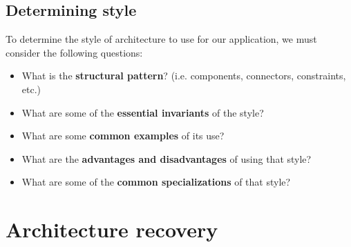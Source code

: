 \documentclass[12pt]{book}
\begin{document}
\subsection*{Determining style}
To determine the style of architecture to use for our application, we must consider the following questions:

\begin{itemize}
  \item What is the \textbf{structural pattern}? (i.e. components, connectors, constraints, etc.)
  \item What are some of the \textbf{essential invariants} of the style? 
  \item What are some \textbf{common examples} of its use?
  \item What are the \textbf{advantages and disadvantages} of using that style?
  \item What are some of the \textbf{common specializations} of that style?
\end{itemize}

\section*{Architecture recovery}
\end{document}
